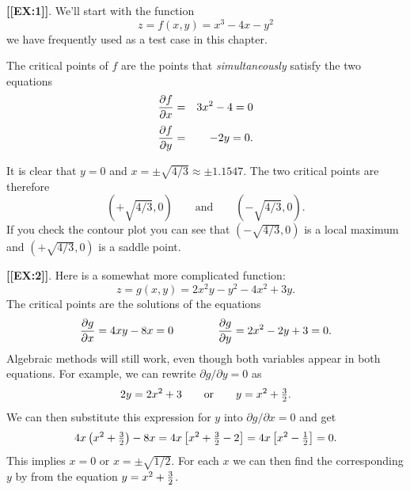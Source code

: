 {{{{{\bf [[EX:1]]}.  We'll start with the function
        \[
z = f(x, y) =  x^3 - 4 x - y^2
\]
we have frequently used as a test case in this chapter.  

        The critical points of $f$ are the points that {\em simultaneously\/} satisfy the two equations
        \begin{eqnarray*}
        {\partial f \over \partial x} &=&  3 x^2 - 4 = 0\\[3pt]
        {\partial f \over \partial y} &=&  - 2 y = 0.
        \end{eqnarray*}
        
\hfill
It is clear that $y = 0$ and $x = \pm \sqrt{4/3} \approx \pm 1.1547$.  The two critical points are therefore
        \[
\left(+\sqrt{4/3}, 0\right) \qquad \mbox{and} \qquad 
                \left(-\sqrt{4/3}, 0\right).
\]
If you check the contour plot you can see that $(-\sqrt{4/3}, 0)$ is a local maximum and $(+\sqrt{4/3}, 0)$ is a saddle point.
\medskip




{\bf [[EX:2]]}.  Here is a somewhat more complicated function:
        \[
z = g(x, y) =  2 x^2 y - y^2 - 4 x^2 + 3 y.
\]
The critical points are the solutions of the equations
        \[
{\partial g \over \partial x} =  4 x y - 8 x = 0 \qquad \qquad
        {\partial g \over \partial y} =  2 x^2 - 2 y + 3 = 0.
\]
Algebraic methods will still work, even though both variables appear in both equations.  For example, we can rewrite ${\partial g/\partial y} = 0$ as
        \[
2y = 2 x^2 + 3 \qquad \mbox{or} \qquad 
                y = x^2 + {\textstyle {3 \over 2}}.
\]
We can then substitute this expression for $y$ into ${\partial g/\partial x} = 0$ and get
        \[
4x \left(x^2 + {\textstyle {3 \over 2}}\right) - 8x =
        4x \left[ x^2 + {\textstyle {3 \over 2}} - 2 \right] =
        4x \left[ x^2 - {\textstyle {1 \over 2}} \right] = 0.
\]
This implies $x = 0$ or $x = \pm \sqrt{1/2}$.  For each $x$ we can then find the corresponding $y$ by from the equation $y = x^2 + {\textstyle {3 \over 2}}$.  

}}}}
